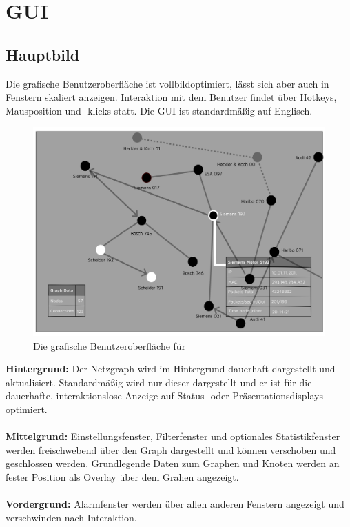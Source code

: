 \chapter{GUI}

\section{Hauptbild}
Die grafische Benutzeroberfläche ist vollbildoptimiert, lässt sich aber auch in
Fenstern skaliert anzeigen. Interaktion mit dem Benutzer findet über Hotkeys,
Mausposition und -klicks statt.
Die GUI ist standardmäßig auf Englisch.

  \begin{figure}[h!]
    \hspace*{0.15cm}\includegraphics[scale=0.07]{./img/GUI.png}
    \caption{Die grafische Benutzeroberfläche für \programname}
  \end{figure}

\noindent \textbf{Hintergrund:} Der Netzgraph wird im Hintergrund dauerhaft dargestellt und
aktualisiert. Standardmäßig wird nur dieser dargestellt und er ist für die
dauerhafte, interaktionslose Anzeige auf Status- oder Präsentationsdisplays
optimiert.
\\ \\
\textbf{Mittelgrund:} Einstellungsfenster, Filterfenster und optionales Statistikfenster
werden freischwebend über den Graph dargestellt und können verschoben und
geschlossen werden. Grundlegende Daten zum Graphen und Knoten werden an fester
Position als Overlay über dem Grahen angezeigt.
\\ \\
\textbf{Vordergrund:} Alarmfenster werden über allen anderen Fenstern angezeigt und
verschwinden nach Interaktion.

